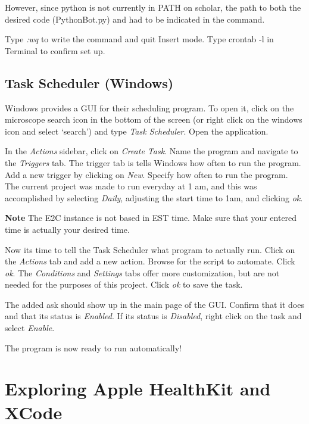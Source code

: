 \documentclass[]{book}
\begin{document}
However, since python is not currently in PATH on scholar, the path to
both the desired code (PythonBot.py) and had to be indicated in the
command.

Type \emph{:wq} to write the command and quit Insert mode. Type crontab
-l in Terminal to confirm set up.

\subsection{Task Scheduler (Windows)}\label{task-scheduler-windows}

Windows provides a GUI for their scheduling program. To open it, click
on the microscope search icon in the bottom of the screen (or right
click on the windows icon and select `search') and type \emph{Task
Scheduler}. Open the application.

In the \emph{Actions} sidebar, click on \emph{Create Task}. Name the
program and navigate to the \emph{Triggers} tab. The trigger tab is
tells Windows how often to run the program. Add a new trigger by
clicking on \emph{New}. Specify how often to run the program. The
current project was made to run everyday at 1 am, and this was
accomplished by selecting \emph{Daily}, adjusting the start time to 1am,
and clicking \emph{ok}.

\textbf{Note} The E2C instance is not based in EST time. Make sure that
your entered time is actually your desired time.

Now its time to tell the Task Scheduler what program to actually run.
Click on the \emph{Actions} tab and add a new action. Browse for the
script to automate. Click \emph{ok}. The \emph{Conditions} and
\emph{Settings} tabs offer more customization, but are not needed for
the purposes of this project. Click \emph{ok} to save the task.

The added ask should show up in the main page of the GUI. Confirm that
it does and that its status is \emph{Enabled}. If its status is
\emph{Disabled}, right click on the task and select \emph{Enable}.

The program is now ready to run automatically!

\section{Exploring Apple HealthKit and
XCode}\label{exploring-apple-healthkit-and-xcode}
\end{document}
